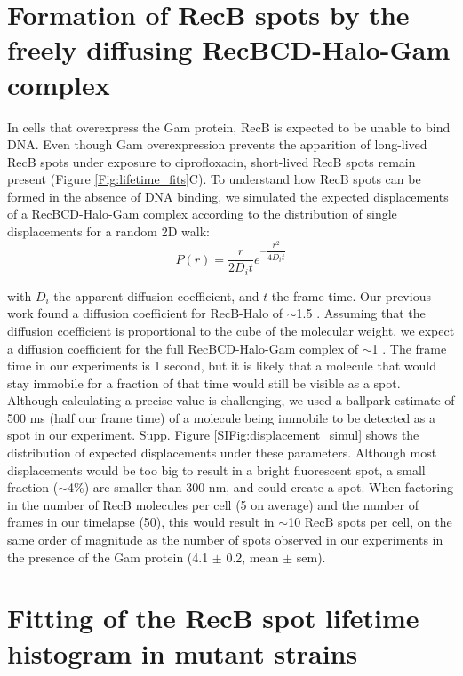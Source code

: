 
\section{Formation of RecB spots by the freely diffusing RecBCD-Halo-Gam complex}
\label{note:spurious_spots}
In cells that overexpress the Gam protein, RecB is expected to be unable to bind DNA. Even though Gam overexpression prevents the apparition of long-lived RecB spots under exposure to ciprofloxacin, short-lived RecB spots remain present (Figure \ref{Fig:lifetime_fits}C). To understand how RecB spots can be formed in the absence of DNA binding, we simulated the expected displacements of a RecBCD-Halo-Gam complex according to the distribution of single displacements for a random 2D walk:
\begin{equation}
    P(r) = \dfrac{r}{2D_i t}e^{-\dfrac{r^2}{4D_i t}}
\end{equation}

with $D_i$ the apparent diffusion coefficient, and $t$ the frame time. Our previous work found a diffusion coefficient for RecB-Halo of $\sim$1.5 \ums. Assuming that the diffusion coefficient is proportional to the cube of the molecular weight, we expect a diffusion coefficient for the full RecBCD-Halo-Gam complex of $\sim$1 \ums. The frame time in our experiments is 1 second, but it is likely that a molecule that would stay immobile for a fraction of that time would still be visible as a spot. Although calculating a precise value is challenging, we used a ballpark estimate of 500 ms (half our frame time) of a molecule being immobile to be detected as a spot in our experiment. Supp. Figure \ref{SIFig:displacement_simul} shows the distribution of expected displacements under these parameters. Although most displacements would be too big to result in a bright fluorescent spot, a small fraction ($\sim$4\%) are smaller than 300 nm, and could create a spot. When factoring in the number of RecB molecules per cell (5 on average) and the number of frames in our timelapse (50), this would result in $\sim$10 RecB spots per cell, on the same order of magnitude as the number of spots observed in our experiments in the presence of the Gam protein (4.1 $\pm$ 0.2, mean $\pm$ sem).

\section{Fitting of the RecB spot lifetime histogram in mutant strains}  %
\label{note:mutants_fitting}



